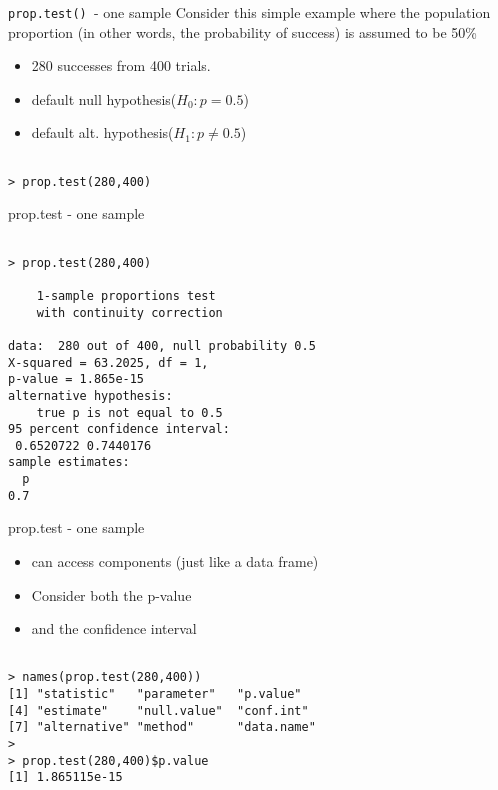 \documentclass[pdf,default,slideColor,colorBG]{prosper}
\begin{document}
\begin{slide}{\texttt{prop.test() }- one sample}
Consider this simple example where the population proportion (in other words, the probability of success) is assumed to be 50\%
\begin{itemize}
\item 280 successes from 400 trials.
\item default null hypothesis($ H_0: p = 0.5 $)
\item default alt. hypothesis($ H_1: p \neq 0.5 $)
\end{itemize}

\begin{verbatim}

> prop.test(280,400)
\end{verbatim}
\end{slide}
\begin{slide}{prop.test - one sample}
\begin{verbatim}

> prop.test(280,400)

    1-sample proportions test
    with continuity correction

data:  280 out of 400, null probability 0.5
X-squared = 63.2025, df = 1,
p-value = 1.865e-15
alternative hypothesis: 
    true p is not equal to 0.5
95 percent confidence interval:
 0.6520722 0.7440176
sample estimates:
  p
0.7
\end{verbatim}


\end{slide}

\begin{slide}{prop.test - one sample}
\begin{itemize}
\item can access components (just like a data frame)
\item Consider both the p-value 
\item and the confidence interval
\end{itemize}

\begin{verbatim}

> names(prop.test(280,400))
[1] "statistic"   "parameter"   "p.value"
[4] "estimate"    "null.value"  "conf.int"
[7] "alternative" "method"      "data.name"
>
> prop.test(280,400)$p.value
[1] 1.865115e-15
\end{verbatim}
\end{slide}
\end{document}
